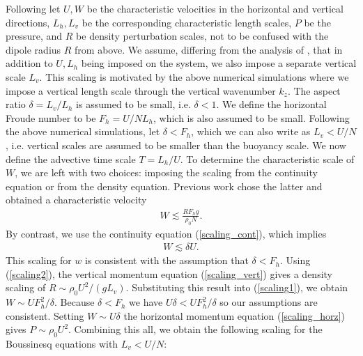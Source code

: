 Following \cite{bc2001} let $U,W$ be the characteristic velocities in the horizontal and vertical directions, $L_{h},L_{v}$ be the corresponding characteristic length scales, $P$ be the pressure, and $R$ be density perturbation scales, not to be confused with the dipole radius $R$ from above. We assume, differing from the analysis of \cite{lilly1983,bc2001}, that in addition to $U,L_{h}$ being imposed on the system, we also impose a separate vertical scale $L_{v}$. This scaling is motivated by the above numerical simulations where we impose a vertical length scale through the vertical wavenumber $k_{z}$. The aspect ratio $\delta=L_{v}/L_{h}$ is assumed to be small, i.e. $\delta<1$. We define the horizontal Froude number to be $F_{h}=U/NL_{h}$, which is also assumed to be small. Following the above numerical simulations, let $\delta < F_{h}$, which we can also write as $L_{v} < U/N$, i.e. vertical scales are assumed to be smaller than the buoyancy scale. We now define the advective time scale $T=L_{h}/U$. 
To determine the characteristic scale of $W$, we are left with two choices: imposing the scaling from the continuity equation or from the density equation. Previous work \cite{bc2001} chose the latter and obtained a characteristic velocity 
\begin{align}
W \lesssim \frac{RF_{h}g}{\rho_{0}N}\label{scaling1}. 
\end{align}
By contrast, we use the continuity equation (\ref{scaling_cont}), which implies
\begin{align}
W \lesssim \delta U\label{scaling2}.
\end{align}
This scaling for $w$ is consistent with the assumption that $\delta < F_{h}$. Using (\ref{scaling2}), the vertical momentum equation (\ref{scaling_vert}) gives a density scaling of $R\sim \rho_{0}U^{2}/(gL_{v})$. Substituting this result into (\ref{scaling1}), we obtain $W\sim UF_{h}^{2}/\delta$. Because $\delta < F_{h}$ we have $U\delta < UF_{h}^{2}/\delta$ so our assumptions are consistent. Setting $W\sim U\delta$ the horizontal momentum equation (\ref{scaling_horz}) gives $P\sim \rho_{0}U^{2}$. Combining this all, we obtain the following scaling for the Boussinesq equations with $L_{v} < U/N$:  


